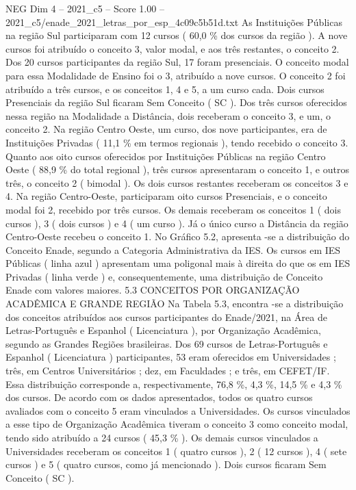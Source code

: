 \begin{textsample}{NEG Dim 4 – 2021\_c5 – Score 1.00 – 2021\_c5/enade\_2021\_letras\_por\_esp\_4c09c5b51d.txt}
As Instituições Públicas na região Sul participaram com 12 cursos ( 60,0 \% dos cursos da região ).
A nove cursos foi atribuído o conceito 3, valor modal, e aos três restantes, o conceito 2.
Dos 20 cursos participantes da região Sul, 17 foram presenciais.
O conceito modal para essa Modalidade de Ensino foi o 3, atribuído a nove cursos.
O conceito 2 foi atribuído a três cursos, e os conceitos 1, 4 e 5, a um curso cada.
Dois cursos Presenciais da região Sul ficaram Sem Conceito ( SC ).
Dos três cursos oferecidos nessa região na Modalidade a Distância, dois receberam o conceito 3, e um, o conceito 2.
Na região Centro Oeste, um curso, dos nove participantes, era de Instituições Privadas ( 11,1 \% em termos regionais ), tendo recebido o conceito 3.
Quanto aos oito cursos oferecidos por Instituições Públicas na região Centro Oeste ( 88,9 \% do total regional ), três cursos apresentaram o conceito 1, e outros três, o conceito 2 ( bimodal ).
Os dois cursos restantes receberam os conceitos 3 e 4.
Na região Centro-Oeste, participaram oito cursos Presenciais, e o conceito modal foi 2, recebido por três cursos.
Os demais receberam os conceitos 1 ( dois cursos ), 3 ( dois cursos ) e 4 ( um curso ).
Já o único curso a Distância da região Centro-Oeste recebeu o conceito 1.
No Gráfico 5.2, apresenta -se a distribuição do Conceito Enade, segundo a Categoria Administrativa da IES.
Os cursos em IES Públicas ( linha azul ) apresentam uma poligonal mais à direita do que os em IES Privadas ( linha verde ) e, consequentemente, uma distribuição de Conceito Enade com valores maiores. 5.3 CONCEITOS POR ORGANIZAÇÃO ACADÊMICA E GRANDE REGIÃO Na Tabela 5.3, encontra -se a distribuição dos conceitos atribuídos aos cursos participantes do Enade/2021, na Área de Letras-Português e Espanhol ( Licenciatura ), por Organização Acadêmica, segundo as Grandes Regiões brasileiras.
Dos 69 cursos de Letras-Português e Espanhol ( Licenciatura ) participantes, 53 eram oferecidos em Universidades ; três, em Centros Universitários ; dez, em Faculdades ; e três, em CEFET/IF.
Essa distribuição corresponde a, respectivamente, 76,8 \%, 4,3 \%, 14,5 \% e 4,3 \% dos cursos.
De acordo com os dados apresentados, todos os quatro cursos avaliados com o conceito 5 eram vinculados a Universidades.
Os cursos vinculados a esse tipo de Organização Acadêmica tiveram o conceito 3 como conceito modal, tendo sido atribuído a 24 cursos ( 45,3 \% ).
Os demais cursos vinculados a Universidades receberam os conceitos 1 ( quatro cursos ), 2 ( 12 cursos ), 4 ( sete cursos ) e 5 ( quatro cursos, como já mencionado ).
Dois cursos ficaram Sem Conceito ( SC ).

\end{textsample}
